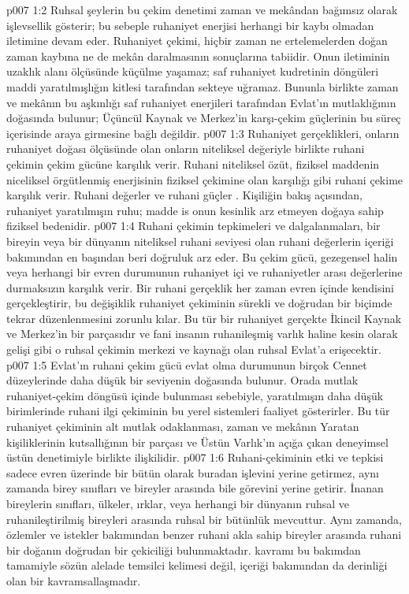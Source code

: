 \vs p007 1:2 Ruhsal şeylerin bu çekim denetimi zaman ve mekândan bağımsız olarak işlevsellik gösterir; bu sebeple ruhaniyet enerjisi herhangi bir kaybı olmadan iletimine devam eder. Ruhaniyet çekimi, hiçbir zaman ne ertelemelerden doğan zaman kaybına ne de mekân daralmasının sonuçlarına tabiidir. Onun iletiminin uzaklık alanı ölçüsünde küçülme yaşamaz; saf ruhaniyet kudretinin döngüleri maddi yaratılmışlığın kitlesi tarafından sekteye uğramaz. Bununla birlikte zaman ve mekânın bu aşkınlığı saf ruhaniyet enerjileri tarafından Evlat’ın mutlaklığının doğasında bulunur; Üçüncül Kaynak ve Merkez’in karşı\hyp{}çekim güçlerinin bu süreç içerisinde araya girmesine bağlı değildir.
\vs p007 1:3 Ruhaniyet gerçeklikleri, onların ruhaniyet doğası ölçüsünde olan onların niteliksel değeriyle birlikte ruhani çekimin çekim gücüne karşılık verir. Ruhani niteliksel özüt, fiziksel maddenin niceliksel örgütlenmiş enerjisinin fiziksel çekimine olan karşılığı gibi ruhani çekime karşılık verir. Ruhani değerler ve ruhani güçler . Kişiliğin bakış açısından, ruhaniyet yaratılmışın ruhu; madde is onun kesinlik arz etmeyen doğaya sahip fiziksel bedenidir.
\vs p007 1:4 Ruhani çekimin tepkimeleri ve dalgalanmaları, bir bireyin veya bir dünyanın niteliksel ruhani seviyesi olan ruhani değerlerin içeriği bakımından en başından beri doğruluk arz eder. Bu çekim gücü, gezegensel halin veya herhangi bir evren durumunun ruhaniyet içi ve ruhaniyetler arası değerlerine durmaksızın karşılık verir. Bir ruhani gerçeklik her zaman evren içinde kendisini gerçekleştirir, bu değişiklik ruhaniyet çekiminin sürekli ve doğrudan bir biçimde tekrar düzenlenmesini zorunlu kılar. Bu tür bir ruhaniyet gerçekte İkincil Kaynak ve Merkez’in bir parçasıdır ve fani insanın ruhanileşmiş varlık haline kesin olarak gelişi gibi o ruhsal çekimin merkezi ve kaynağı olan ruhsal Evlat’a erişecektir.
\vs p007 1:5 Evlat’ın ruhani çekim gücü evlat olma durumunun birçok Cennet düzeylerinde daha düşük bir seviyenin doğasında bulunur. Orada mutlak ruhaniyet\hyp{}çekim döngüsü içinde bulunması sebebiyle, yaratılmışın daha düşük birimlerinde ruhani ilgi çekiminin bu yerel sistemleri faaliyet gösterirler. Bu tür ruhaniyet çekiminin alt mutlak odaklanması, zaman ve mekânın Yaratan kişiliklerinin kutsallığının bir parçası ve Üstün Varlık’ın açığa çıkan deneyimsel üstün denetimiyle birlikte ilişkilidir.
\vs p007 1:6 Ruhani\hyp{}çekiminin etki ve tepkisi sadece evren üzerinde bir bütün olarak buradan işlevini yerine getirmez, aynı zamanda birey sınıfları ve bireyler arasında bile görevini yerine getirir. İnanan bireylerin sınıfları, ülkeler, ırklar, veya herhangi bir dünyanın ruhsal ve ruhanileştirilmiş bireyleri arasında ruhsal bir bütünlük mevcuttur. Aynı zamanda, özlemler ve istekler bakımından benzer ruhani akla sahip bireyler arasında ruhani bir doğanın doğrudan bir çekiciliği bulunmaktadır.  kavramı bu bakımdan tamamiyle sözün alelade temsilci kelimesi değil, içeriği bakımından da derinliği olan bir kavramsallaşmadır.

